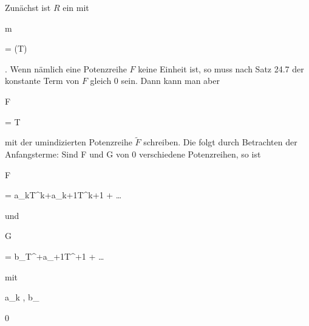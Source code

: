 {


Zunächst ist $R$ ein
mit


\mavergleichskette

{\vergleichskette

{ {\mathfrak m}
}

{ = }{ (T)
}

{  }{
}

{    }{
}

{   }{
}

}
{}{}{.}
Wenn nämlich eine Potenzreihe $F$ keine Einheit ist, so muss nach
Satz 24.7
der konstante Term von $F$ gleich $0$ sein. Dann kann man aber


\mavergleichskette

{\vergleichskette

{F
}

{ = }{ T 
}

{  }{
}

{    }{
}

{   }{
}

}
{}{}{}
mit der umindizierten Potenzreihe $\tilde{F}$ schreiben. Die
folgt durch Betrachten der Anfangsterme: Sind
\mathkor {} {F} {und} {G} {}
von $0$ verschiedene Potenzreihen, so ist


\mavergleichskettedisp

{\vergleichskette

{ F
}

{ =} { a_kT^k+a_{k+1}T^{k+1} + \ldots
}

{ } {
}

{ } {
}

{ } {
}

}
{}{}{}
und


\mavergleichskettedisp

{\vergleichskette

{G
}

{ =} {b_\ell T^\ell+a_{\ell+1}T^{\ell+1} + \ldots
}

{ } {
}

{ } {
}

{ } {
}

}
{}{}{}
mit


\mavergleichskette

{\vergleichskette

{ a_k , b_\ell
}

{ \neq }{ 0
}

{  }{
}

}}
